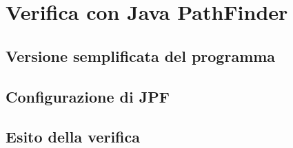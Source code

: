 \chapter{Verifica con Java PathFinder}

%
%
\section{Versione semplificata del programma}

%
%
\section{Configurazione di JPF}

%
%
\section{Esito della verifica}
